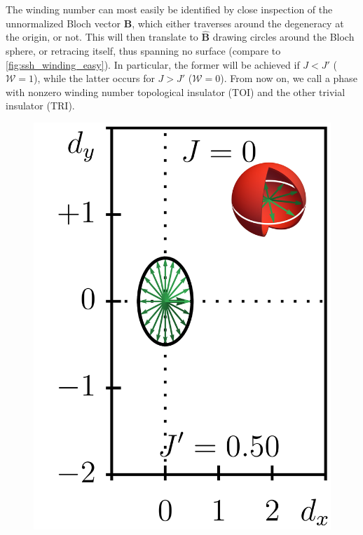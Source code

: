 The winding number can most easily be identified by close inspection of the unnormalized Bloch vector ${\bm B}$, which either traverses around the degeneracy at the origin, or not.
This will then translate to $\hat{\bm B}$ drawing circles around the Bloch sphere, or retracing itself, thus spanning no surface (compare to \cref{fig:ssh_winding_easy}).
In particular, the former will be achieved if $J<J'$ ($\mathcal W=1$), while the latter occurs for $J>J'$ ($\mathcal W=0$).
From now on, we call a phase with nonzero winding number topological insulator (TOI) and the other trivial insulator (TRI).
\begin{figure}[ht]
    \centering
    \includegraphics{figures/ssh_unnormalized_winding_2.png}

\end{figure}
